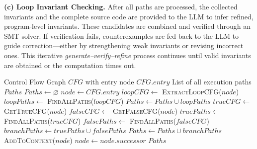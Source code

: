 \textbf{(c) Loop Invariant Checking.} After all paths are processed, the collected invariants and the complete source code are provided to the LLM to infer refined, program-level invariants. These candidates are combined and verified through an SMT solver. If verification fails, counterexamples are fed back to the LLM to guide correction—either by strengthening weak invariants or revising incorrect ones. This iterative \textit{generate–verify–refine} process continues until valid invariants are obtained or the computation times out.






\begin{algorithm}[t]
\caption{FindAllPaths in a Control Flow Graph (CFG)}
\label{alg:findallpaths}
\begin{algorithmic}[1]
\REQUIRE Control Flow Graph $CFG$ with entry node $CFG.entry$
\ENSURE List of all execution paths $Paths$
\STATE $Paths \gets \varnothing$
\STATE $node \gets CFG.entry$
            \STATE $loopCFG \gets$ \textsc{ExtractLoopCFG}($node$)
            \STATE $loopPaths \gets$ \textsc{FindAllPaths}($loopCFG$)
            \STATE $Paths \gets Paths \cup loopPaths$
        \ELSE 
            \STATE $trueCFG \gets$ \textsc{GetTrueCFG}($node$)
            \STATE $falseCFG \gets$ \textsc{GetFalseCFG}($node$)
            \STATE $truePaths \gets$ \textsc{FindAllPaths}($trueCFG$)
            \STATE $falsePaths \gets$ \textsc{FindAllPaths}($falseCFG$)
            \STATE $branchPaths \gets truePaths \cup falsePaths$
            \STATE $Paths \gets Paths \cup branchPaths$
        \ENDIF
        \STATE \textsc{AddToContext}($node$)
    \ENDIF
    \STATE $node \gets node.successor$
\ENDWHILE
\RETURN $Paths$
\end{algorithmic}
\end{algorithm}



